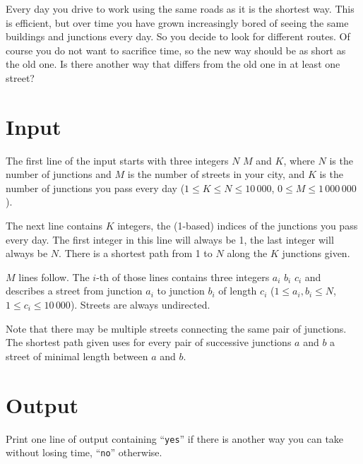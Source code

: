
Every day you drive to work using the same roads as it is the shortest way.
This is efficient, but over time you have grown increasingly bored of seeing
the same buildings and junctions every day. So you decide to look for different
routes. Of course you do not want to sacrifice time, so the new way should be
as short as the old one. Is there another way that differs from the old one in
at least one street?

\section*{Input}
The first line of the input starts with three integers $N$ $M$ and $K$, where
$N$ is the number of junctions and $M$ is the number of streets in your city,
and $K$ is the number of junctions you pass every day
($1 \leq K \leq N\leq 10\,000$,\; $0\leq M\leq 1\,000\,000$).

The next line contains $K$ integers, the (1-based) indices of the junctions you
pass every day. The first integer in this line will always be 1, the last
integer will always be $N$. There is a shortest path from 1 to $N$ along the
$K$ junctions given.

$M$ lines follow. The $i$-th of those lines contains three integers $a_i$ $b_i$
$c_i$ and describes a street from junction $a_i$ to junction $b_i$ of length
$c_i$ ($1\leq a_i,b_i\leq N$,\; $1\leq c_i\leq 10\,000$).
Streets are always undirected.

Note that there may be multiple streets connecting the same pair of junctions.
The shortest path given uses for every pair of successive junctions $a$ and $b$
a street of minimal length between $a$ and $b$.

\section*{Output}
Print one line of output containing
``{\tt yes}'' if there is another way you can take without losing time,
``{\tt no}'' otherwise.
